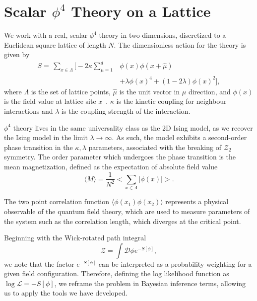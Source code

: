 \documentclass[11pt]{article}
\begin{document}
\section{Scalar $\phi^4$ Theory on a Lattice}\label{sec:phi^4_theory}
    We work with a real, scalar $\phi^4$-theory in two-dimensions, discretized to a Euclidean square lattice of length $N$.
    The dimensionless action for the theory is given by
    \begin{equation}\label{eq:phi4_action}
    \begin{aligned}
        S = \,\sum\limits_{x \in \Lambda} \Biggl[-2\kappa \sum\limits_{\mu=1}^d & \phi(x) \phi(x+\hat{\mu}) \\
        &+\lambda \phi(x)^4 + (1 - 2\lambda) \phi(x)^2 \Biggr],
    \end{aligned}
    \end{equation}
    where $\Lambda$ is the set of lattice points, $\hat{\mu}$ is the unit vector in $\mu$ direction, and $\phi(x)$ is
    the field value at lattice site $x$~\cite{maas2020lattice}. $\kappa$ is the kinetic coupling for neighbour interactions and $\lambda$ is the
    coupling strength of the interaction.

    $\phi^4$ theory lives in the same universality class as the 2D Ising model, as we recover the Ising model
    in the limit $\lambda \rightarrow \infty$.
    As such, the model exhibits a second-order phase transition in the $\kappa, \lambda$ parameters, associated
    with the breaking of $\mathcal{Z}_2$ symmetry.
    The order parameter which undergoes the phase transition is the mean magnetization, defined as the expectation of
    absolute field value
    \begin{equation}\label{eq:magnetization}
        \langle M \rangle = \frac{1}{N^2} \bigl< \sum_{x \in \Lambda} |\phi(x)| \bigr>.
    \end{equation}

    The two point correlation function $\langle \phi(x_1) \phi(x_2) \rangle$ represents a physical observable of the
    quantum field theory, which are used to measure parameters of the system such as the correlation length,
    which diverges at the critical point.

    Beginning with the Wick-rotated path integral~\cite{maas2020lattice}
    \begin{equation}\label{eq:path_integral}
        \mathcal{Z} = \int {\mathcal{D}\phi e^{-S[\phi]}},
    \end{equation}
    we note that the factor $e^{-S[\phi]}$ can be interpreted as a probability weighting for a given field configuration.
    Therefore, defining the log likelihood function as $\log{\mathcal{L}} = -S[\phi]$, we reframe the problem in
    Bayesian inference terms, allowing us to apply the tools we have developed.
\end{document}

